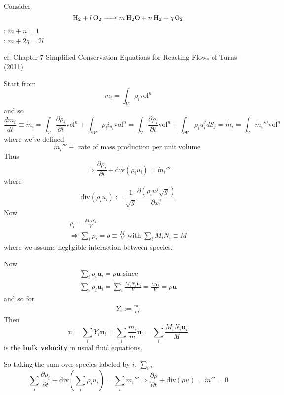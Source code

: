 \documentclass[10pt]{amsart}
\begin{document}
\begin{multicols*}{2}
Consider
\[
\ce{H2 + l O2  -> m H2O + n H2 + q O2 }
\]
 : $m+n =1$ \\
 : $m+2q = 2l$  





cf. Chapter 7 Simplified Conservation Equations for Reacting Flows of Turns (2011) \cite{STurns2011}








Start from
\begin{equation}
  m_i = \int_V \rho_i \text{vol}^n
\end{equation}
and so
\[
\frac{dm_i}{dt} \equiv \dot{m}_i = \int_V \frac{ \partial \rho_i}{ \partial t} \text{vol}^n + \int_{\partial V} \rho_i i_{u_i} \text{vol}^n = \int_V \frac{ \partial \rho_i}{ \partial t} \text{vol}^n + \int_{\partial V} \rho_i u^j_i dS_j = \dot{m}_i = \int_V \dot{m}_i'''\text{vol}^n
\]
where we've defined
\[
\dot{m}_i''' \equiv \text{ rate of mass production per unit volume }
\]
Thus
\[
\Longrightarrow \frac{ \partial \rho_i}{ \partial t} + \text{div}(\rho_i u_i) = \dot{m}_i'''
\]
where 
\[
\text{div}(\rho_i u_i) := \frac{1}{\sqrt{g}} \frac{ \partial (\rho_i u^j \sqrt{g})}{ \partial x^j }
\]
Now
\[
\begin{gathered}
  \rho_i = \frac{M_i N_i }{V} \\ 
  \Longrightarrow \sum_i \rho_i = \rho \equiv \frac{M}{V} \text{ with } \sum_i M_i N_i \equiv M 
\end{gathered}
\]
where we assume negligible interaction between species.  

Now
\[
\begin{gathered}
  \sum_i \rho_i \mathbf{u}_i = \rho \mathbf{u} \text{ since } \\
  \sum_i \rho_i \mathbf{u}_i = \sum_i \frac{M_i N_i \mathbf{u}_i }{ V } = \frac{M \mathbf{u}}{V} = \rho\mathbf{u}
\end{gathered}
\]
and so for 
\[
\begin{gathered}
  Y_i := \frac{m_i}{m} 
\end{gathered}
\]
Then
\begin{equation}
  \mathbf{u} = \sum_i Y_i \mathbf{u}_i = \sum_i \frac{m_i}{m} \mathbf{u}_i = \sum_i \frac{M_i N_i \mathbf{u}_i }{ M }
\end{equation}
is the \textbf{bulk velocity} in usual fluid equations.  

So taking the sum over species labeled by $i$, $\sum_i$, 
\begin{equation}
  \sum_i \frac{ \partial \rho_i}{ \partial t} + \text{div}(\sum_i \rho_i u_i ) = \sum_i \dot{m}_i''' \Longrightarrow \frac{ \partial \rho }{ \partial t} + \text{div}(\rho u) = \dot{m}''' = 0 
\end{equation}


\end{multicols*}
\end{document}
